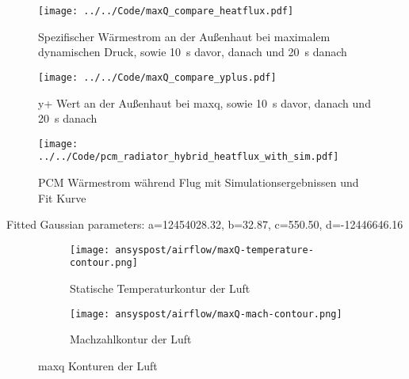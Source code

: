 \begin{figure}[H]
  \centering
  \texttt{[image: ../../Code/maxQ\_compare\_heatflux.pdf]}
  \caption{Spezifischer Wärmestrom an der Außenhaut bei maximalem dynamischen Druck, sowie \SI{10}{s} davor, danach und \SI{20}{s} danach}\label{fig:spezifischer_waermestrom_maxQ_simulationen}
\end{figure}

\begin{figure}[H]
  \centering
  \texttt{[image: ../../Code/maxQ\_compare\_yplus.pdf]}
  \caption{y+ Wert an der Außenhaut bei \ac{maxq}, sowie \SI{10}{s} davor, danach und \SI{20}{s} danach}\label{fig:yplus_maxQ_simulationen}
\end{figure}

\begin{figure}[H]
  \centering
  \texttt{[image: ../../Code/pcm\_radiator\_hybrid\_heatflux\_with\_sim.pdf]}
  \caption{PCM Wärmestrom während Flug mit Simulationsergebnissen und Fit Kurve}\label{fig:pcm_waermestrom_sim}
\end{figure}

Fitted Gaussian parameters:
a=12454028.32, b=32.87, c=550.50, d=-12446646.16

\begin{figure}[H]
    \centering

    \begin{subfigure}{\textwidth}
        \centering
        \texttt{[image: ansyspost/airflow/maxQ-temperature-contour.png]}
        \caption{Statische Temperaturkontur der Luft}
        \label{fig:maxQ_temp_contour}
    \end{subfigure}

    \begin{subfigure}{\textwidth}
        \centering
        \texttt{[image: ansyspost/airflow/maxQ-mach-contour.png]}
        \caption{Machzahlkontur der Luft}
        \label{fig:maxQ_mach_contour}
    \end{subfigure}

    \caption{\texorpdfstring{\ac{maxq}}{max Q} Konturen der Luft}
    \label{fig:maxQ_konturen}
\end{figure}